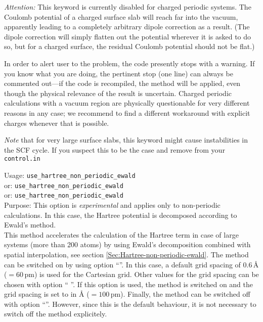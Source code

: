 
\emph{Attention:} This keyword is currently disabled for charged periodic
systems. The Coulomb potential of a charged surface slab will reach
far into the vacuum, apparently leading to a completely arbitrary
dipole correction as a result. (The dipole correction will simply
flatten out the potential wherever it is asked 
to do so, but for a charged surface, the residual Coulomb potential should not
be flat.) 

In order to alert user to the problem, the code presently stops
with a warning. If you know what you are doing, the pertinent stop (one line)
can always be commented out---if the code is recompiled, the method will be
applied, even though the physical relevance of the result is
uncertain. Charged periodic calculations with a
vacuum region are physically questionable for very different reasons
in any case; we recommend to find a different workaround with explicit
charges whenever that is possible.

\emph{Note} that for very large surface slabs, this keyword might cause 
instabilities in the SCF cycle. If you suspect this to be the case and remove 
 from your \texttt{control.in}


{
  \noindent
  Usage: \texttt{use\_hartree\_non\_periodic\_ewald}  \\
  or:    \texttt{use\_hartree\_non\_periodic\_ewald} 
                                                         \\
  or:    \texttt{use\_hartree\_non\_periodic\_ewald}  \\[1.0ex]
  Purpose: This option is \emph{experimental} and applies only to non-periodic
  calculations. In this case, the Hartree potential is decomposed according to
  Ewald's method.  \\[1.0ex]
}
This method accelerates the calculation of the Hartree term in case of large
systems (more than 200 atoms) by using Ewald's decomposition combined with
spatial interpolation, see section \ref{Sec:Hartree-non-periodic-ewald}. The
method can be switched on by using option ``''. In this case, a
default grid spacing of 0.6\,\r{A} ($=60\,$pm) is used for the Cartesian grid.
Other values for the grid spacing can be chosen with option
`` ''. If this option is used, the method is
switched on and the grid spacing is set to  in \r{A} ($=100\,$pm).
Finally, the method can be switched off with option ``''.
However, since this is the default behaviour, it is not necessary to switch off
the method explicitely.


